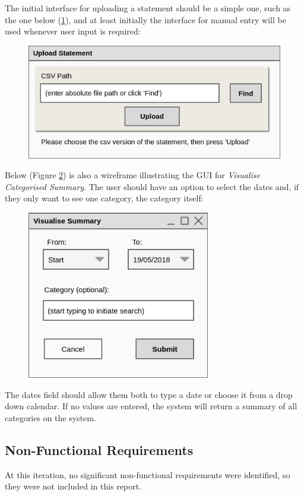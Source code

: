 The initial interface for uploading a statement should be a simple one, such as
the one below
(\ref{fig:Wireframe.UploadStatement}), and at least initially the interface for
manual entry will be used whenever user input is required:
\begin{figure}[ht!]
  \begin{center}
    \includegraphics[width=12cm]{./contents/img/Wireframe_-_Upload_Statement.png}
  \end{center}
  \caption{}
  \label{fig:Wireframe.UploadStatement}
\end{figure}
\FloatBarrier

Below (Figure \ref{fig:Wireframe.VisualiseCategorisedSummary}) is also a
wireframe illustrating the GUI for \emph{Visualise Categorised Summary}. The
user should have an option to select the dates and, if they only want to see
one category, the category itself:
\begin{figure}[ht!]
  \begin{center}
    \includegraphics[width=8cm]{./contents/img/Wireframe_-_Visualise_Summary.png}
  \end{center}
  \caption{}
  \label{fig:Wireframe.VisualiseCategorisedSummary}
\end{figure}
\FloatBarrier

The dates field should allow them both to type a date or choose it from a drop
down calendar. If no values are entered, the system will return a summary of
all categories on the system.




\subsection{Non-Functional Requirements} \label{sec:Requirements.NonFunctionalRequirements}
At this iteration, no significant non-functional requirements were identified,
so they were not included in this report.
